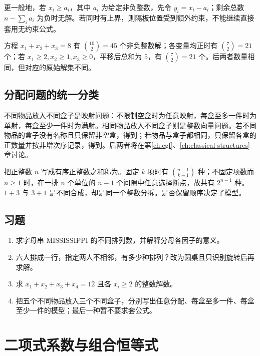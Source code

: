 \documentclass[UTF8,12pt,a4paper,fontset=fandol]{ctexbook}
\begin{document}
更一般地，若 $x_i\ge a_i$，其中 $a_i$ 为给定非负整数，先令 $y_i=x_i-a_i$；剩余总数 $n-\sum_i a_i$ 为负时无解。若同时有上界，则隔板位置受到额外约束，不能继续直接套用无约束公式。

\begin{example}
方程 $x_1+x_2+x_3=8$ 有 $\binom{10}{2}=45$ 个非负整数解；各变量均正时有 $\binom72=21$ 个；若 $x_1\ge2,x_2\ge1,x_3\ge0$，平移后总和为 $5$，有 $\binom72=21$ 个。后两者数量相同，但对应的原始解集不同。
\end{example}

\section{分配问题的统一分类}

不同物品放入不同盒子是映射问题：不限制空盒时为任意映射，每盒至多一件时为单射，每盒至少一件时为满射。相同物品放入不同盒子则是整数向量问题。若不同物品的盒子没有名称且只保留非空盒，得到；若物品与盒子都相同，只保留各盒的正数量并按非增次序记录，得到。后两者将在第\ref{ch:egf}、\ref{ch:classical-structures}章讨论。

把正整数 $n$ 写成有序正整数之和称为。固定 $k$ 项时有 $\binom{n-1}{k-1}$ 种；不固定项数而 $n\ge1$ 时，在一排 $n$ 个单位的 $n-1$ 个间隙中任意选择断点，故共有 $2^{n-1}$ 种。$1+3$ 与 $3+1$ 是不同合成，却是同一个整数分拆。是否保留顺序决定了模型。

\section{习题}
\begin{enumerate}
  \item\label{ex:elementary-counting-1} 求字母串 $\mathrm{MISSISSIPPI}$ 的不同排列数，并解释分母各因子的意义。
  \item\label{ex:elementary-counting-2} 六人排成一行，指定两人不相邻，有多少种排列？改为圆桌且只识别旋转后再求解。
  \item\label{ex:elementary-counting-3} 求 $x_1+x_2+x_3+x_4=12$ 且各 $x_i\ge2$ 的整数解数。
  \item\label{ex:elementary-counting-4} 把五个不同物品放入三个不同盒子，分别写出任意分配、每盒至多一件、每盒至少一件的模型；最后一种暂不要求套公式。
\end{enumerate}

\chapter{二项式系数与组合恒等式}
\label{ch:identities}
\end{document}
